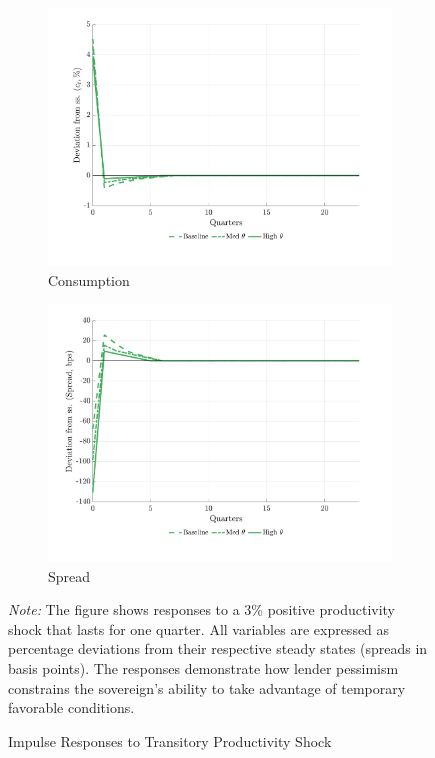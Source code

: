\documentclass[12pt]{article}
\theoremstyle{plain}
\begin{document}
\begin{figure}[h]
\begin{subfigure}[b]{0.48\textwidth}
		\centering
		\includegraphics[width=\textwidth]{../../pessimism-default-model/results/comparison_figure_15.pdf}
		\caption{Consumption}
		\label{fig:irf_trans_consumption}
	\end{subfigure}
	\hfill
	\begin{subfigure}[b]{0.48\textwidth}
		\centering
		\includegraphics[width=\textwidth]{../../pessimism-default-model/results/comparison_figure_16.pdf}
		\caption{Spread}
		\label{fig:irf_trans_spread}
	\end{subfigure}
	\caption{Impulse Responses to Transitory Productivity Shock}
	\label{fig:irf_transitory}
	\parbox{\linewidth}{\small\textit{Note:} The figure shows responses to a 3\% positive productivity shock that lasts for one quarter. All variables are expressed as percentage deviations from their respective steady states (spreads in basis points). The responses demonstrate how lender pessimism constrains the sovereign's ability to take advantage of temporary favorable conditions.}
\end{figure}
\end{document}
